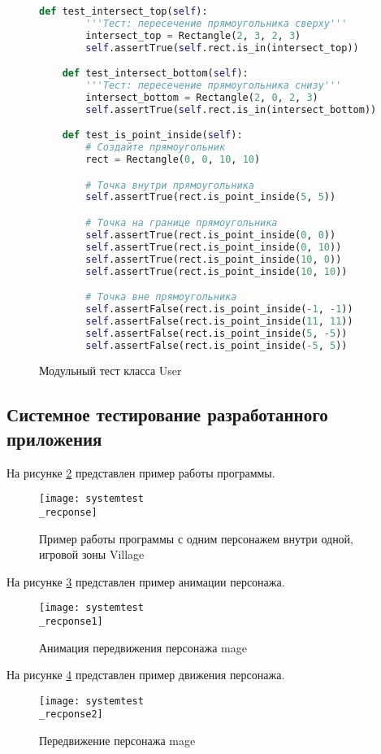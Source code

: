 \begin{figure}[ht]
\begin{lstlisting}[language=Python]
	def test_intersect_top(self):
		'''Тест: пересечение прямоугольника сверху'''
		intersect_top = Rectangle(2, 3, 2, 3)
		self.assertTrue(self.rect.is_in(intersect_top))

	def test_intersect_bottom(self):
		'''Тест: пересечение прямоугольника снизу'''
		intersect_bottom = Rectangle(2, 0, 2, 3)
		self.assertTrue(self.rect.is_in(intersect_bottom))

	def test_is_point_inside(self):
		# Создайте прямоугольник
		rect = Rectangle(0, 0, 10, 10)

		# Точка внутри прямоугольника
		self.assertTrue(rect.is_point_inside(5, 5))

		# Точка на границе прямоугольника
		self.assertTrue(rect.is_point_inside(0, 0))
		self.assertTrue(rect.is_point_inside(0, 10))
		self.assertTrue(rect.is_point_inside(10, 0))
		self.assertTrue(rect.is_point_inside(10, 10))

		# Точка вне прямоугольника
		self.assertFalse(rect.is_point_inside(-1, -1))
		self.assertFalse(rect.is_point_inside(11, 11))
		self.assertFalse(rect.is_point_inside(5, -5))
		self.assertFalse(rect.is_point_inside(-5, 5))
\end{lstlisting}  
\caption{Модульный тест класса User}
\label{unitUser:image}
\end{figure}

\subsection{Системное тестирование разработанного приложения}

На рисунке \ref{systemtest_recponse:image} представлен пример работы программы.
\begin{figure}[H]
	\centering
	\texttt{[image: systemtest\\\_recponse]}
	\caption{Пример работы программы с одним персонажем внутри одной, игровой зоны Village}
	\label{systemtest_recponse:image}
\end{figure}

На рисунке \ref{systemtest_recponse1:image} представлен пример анимации персонажа.
\begin{figure}[H]
	\centering
	\texttt{[image: systemtest\\\_recponse1]}
	\caption{Анимация передвижения персонажа mage}
	\label{systemtest_recponse1:image}
\end{figure}

На рисунке \ref{systemtest_recponse2:image} представлен пример движения персонажа.
\begin{figure}[H]
	\centering
	\texttt{[image: systemtest\\\_recponse2]}
	\caption{Передвижение персонажа mage}
	\label{systemtest_recponse2:image}
\end{figure}

